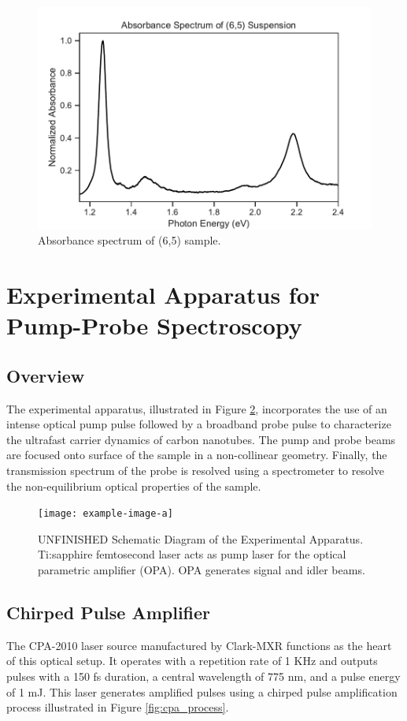 \begin{figure}[H]
	\centering
	\includegraphics[scale=0.7]{images/chapter_methods/sample_absorbance}
	\caption{ Absorbance spectrum of (6,5) sample.}
	\label{fig:sample_absorbance}
\end{figure}

\section{Experimental Apparatus for Pump-Probe Spectroscopy}

\subsection{Overview}
The experimental apparatus, illustrated in Figure \ref{fig:setup_schematic}, incorporates the use of an intense optical pump pulse followed by a broadband probe pulse to characterize the ultrafast carrier dynamics of carbon nanotubes. The pump and probe beams are focused onto surface of the sample in a non-collinear geometry. Finally, the transmission spectrum of the probe is resolved using a spectrometer to resolve the non-equilibrium optical properties of the sample.  


\begin{figure}[h]
	\centering
	\texttt{[image: example-image-a]}
	\caption{{ \color{red} UNFINISHED} Schematic Diagram of the Experimental Apparatus. Ti:sapphire femtosecond laser acts as pump laser for the optical parametric amplifier (OPA). OPA generates signal and idler beams.  }
	\label{fig:setup_schematic}
\end{figure}


\subsection{Chirped Pulse Amplifier}
The CPA-2010 laser source manufactured by Clark-MXR functions as the heart of this optical setup. It operates with a repetition rate of 1 KHz and outputs pulses with a 150 fs duration, a central wavelength of 775 nm, and a pulse energy of 1 mJ. This laser generates amplified pulses using a chirped pulse amplification process illustrated in Figure \ref{fig:cpa_process}. 

